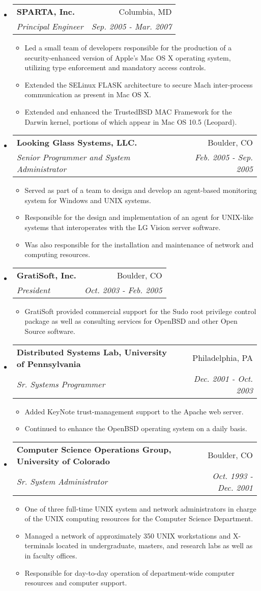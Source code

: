 \documentclass[letterpaper,11pt]{article}
\makeatletter
\newcommand{\resitem}[1]{\item #1 \vspace{-2pt}}
\newcommand{\ressubheading}[4]{
\begin{tabular*}{7.0in}{l@{\extracolsep{\fill}}r}
      \textbf{#1} & #2 \\
      \textit{#3} & \textit{#4} \\
\end{tabular*}\vspace{-6pt}}
\makeatother
\begin{document}
\begin{itemize}
\item
   \ressubheading{SPARTA, Inc.}{Columbia, MD}{Principal Engineer}{Sep. 2005 - Mar. 2007}
   \begin{itemize}
      \resitem{Led a small team of developers responsible for the production of a security-enhanced version of Apple's Mac OS X operating system, utilizing type enforcement and mandatory access controls.}
      \resitem{Extended the SELinux FLASK architecture to secure Mach inter-process communication as present in Mac OS X.}
      \resitem{Extended and enhanced the TrustedBSD MAC Framework for the Darwin kernel, portions of which appear in Mac OS 10.5 (Leopard).}
   \end{itemize}

\item
   \ressubheading{Looking Glass Systems, LLC.}{Boulder, CO}{Senior Programmer and System Administrator}{Feb. 2005 - Sep. 2005}
   \begin{itemize}
      \resitem{Served as part of a team to design and develop an agent-based monitoring system for Windows and {\sc UNIX} systems.}
      \resitem{Responsible for the design and implementation of an agent for UNIX-like systems that interoperates with the LG Vision server software.}
      \resitem{Was also responsible for the installation and maintenance of network and computing resources.}
   \end{itemize}

\item
   \ressubheading{GratiSoft, Inc.}{Boulder, CO}{President}{Oct. 2003 - Feb. 2005}
   \begin{itemize}
      \resitem{GratiSoft provided commercial support for the Sudo root privilege control package as well as consulting services for OpenBSD and other Open Source software.}
   \end{itemize}

\item
   \ressubheading{Distributed Systems Lab, University of Pennsylvania}{Philadelphia, PA}{Sr. Systems Programmer}{Dec. 2001 - Oct. 2003}
   \begin{itemize}
      \resitem{Added KeyNote trust-management support to the Apache web server.}
      \resitem{Continued to enhance the OpenBSD operating system on a daily basis.}
   \end{itemize}

\item
   \ressubheading{Computer Science Operations Group, University of Colorado}{Boulder, CO}{Sr. System Administrator}{Oct. 1993 - Dec. 2001}
   \begin{itemize}
      \resitem{One of three full-time {\sc UNIX} system and network administrators in charge of the {\sc UNIX} computing resources for the Computer Science Department.}
      \resitem{Managed a network of approximately 350 {\sc UNIX} workstations and X-terminals located in undergraduate, masters, and research labs as well as in faculty offices.}
      \resitem{Responsible for day-to-day operation of department-wide computer resources and computer support.}
   \end{itemize}


\end{itemize}
\end{document}
